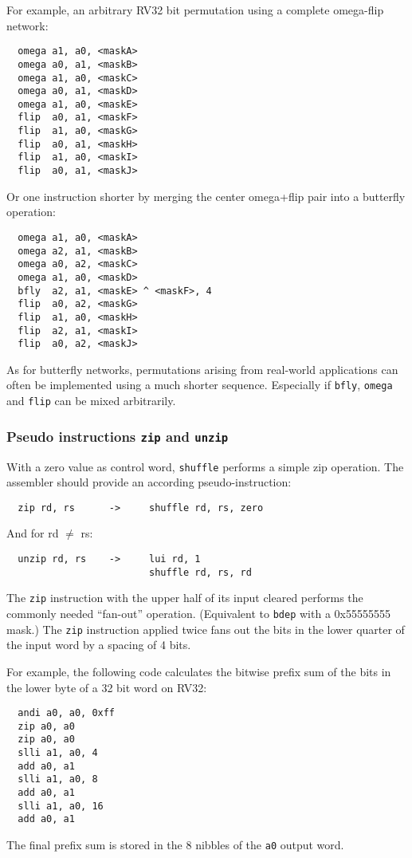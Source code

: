For example, an arbitrary RV32 bit permutation using a complete omega-flip network:

\begin{verbatim}
  omega a1, a0, <maskA>
  omega a0, a1, <maskB>
  omega a1, a0, <maskC>
  omega a0, a1, <maskD>
  omega a1, a0, <maskE>
  flip  a0, a1, <maskF>
  flip  a1, a0, <maskG>
  flip  a0, a1, <maskH>
  flip  a1, a0, <maskI>
  flip  a0, a1, <maskJ>
\end{verbatim}

Or one instruction shorter by merging the center omega+flip pair into a
butterfly operation:

\begin{verbatim}
  omega a1, a0, <maskA>
  omega a2, a1, <maskB>
  omega a0, a2, <maskC>
  omega a1, a0, <maskD>
  bfly  a2, a1, <maskE> ^ <maskF>, 4
  flip  a0, a2, <maskG>
  flip  a1, a0, <maskH>
  flip  a2, a1, <maskI>
  flip  a0, a2, <maskJ>
\end{verbatim}

As for butterfly networks, permutations arising from real-world applications
can often be implemented using a much shorter sequence. Especially if {\tt bfly},
{\tt omega} and {\tt flip} can be mixed arbitrarily.

\subsubsection{Pseudo instructions {\tt zip} and {\tt unzip}}

With a zero value as control word, {\tt shuffle} performs a simple zip
operation. The assembler should provide an according pseudo-instruction:

\begin{verbatim}
  zip rd, rs      ->     shuffle rd, rs, zero
\end{verbatim}

And for rd $\neq$ rs:

\begin{verbatim}
  unzip rd, rs    ->     lui rd, 1
                         shuffle rd, rs, rd
\end{verbatim}

The \texttt{zip} instruction with the upper half of its input cleared performs
the commonly needed ``fan-out'' operation. (Equivalent to {\tt bdep} with a
0x55555555 mask.) The \texttt{zip} instruction applied twice fans out the bits
in the lower quarter of the input word by a spacing of 4 bits.

For example, the following code calculates the bitwise prefix sum of the bits
in the lower byte of a 32 bit word on RV32:

\begin{verbatim}
  andi a0, a0, 0xff
  zip a0, a0
  zip a0, a0
  slli a1, a0, 4
  add a0, a1
  slli a1, a0, 8
  add a0, a1
  slli a1, a0, 16
  add a0, a1
\end{verbatim}

The final prefix sum is stored in the 8 nibbles of the {\tt a0} output word.
